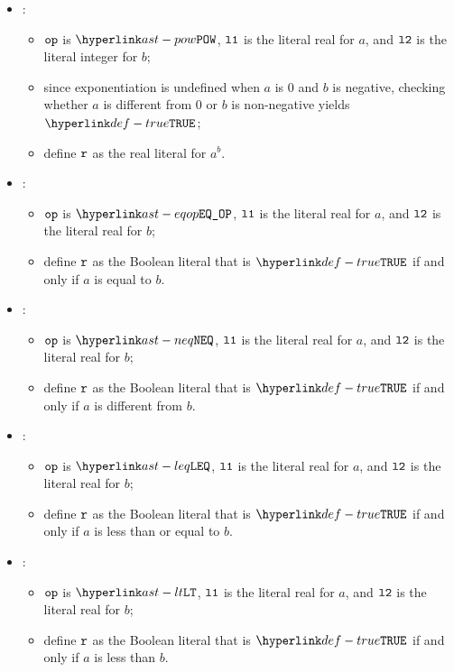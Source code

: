 \begin{itemize}
  \item {}:
  \begin{itemize}
    \item $\texttt{op}$ is $\POW$, $\texttt{l1}$ is the literal real for $a$, and $\texttt{l2}$ is the literal integer for $b$;
    \item since exponentiation is undefined when $a$ is 0 and $b$ is negative,
          checking whether $a$ is different from $0$ or $b$ is non-negative yields $\True$\ProseOrTypeError;
    \item define $\texttt{r}$ as the real literal for $a^b$.
  \end{itemize}

  \item {}:
  \begin{itemize}
    \item $\texttt{op}$ is $\EQOP$, $\texttt{l1}$ is the literal real for $a$, and $\texttt{l2}$ is the literal real for $b$;
    \item define $\texttt{r}$ as the Boolean literal that is $\True$ if and only if $a$ is equal to $b$.
  \end{itemize}

  \item {}:
  \begin{itemize}
    \item $\texttt{op}$ is $\NEQ$, $\texttt{l1}$ is the literal real for $a$, and $\texttt{l2}$ is the literal real for $b$;
    \item define $\texttt{r}$ as the Boolean literal that is $\True$ if and only if $a$ is different from $b$.
  \end{itemize}

  \item {}:
  \begin{itemize}
    \item $\texttt{op}$ is $\LEQ$, $\texttt{l1}$ is the literal real for $a$, and $\texttt{l2}$ is the literal real for $b$;
    \item define $\texttt{r}$ as the Boolean literal that is $\True$ if and only if $a$ is less than or equal to $b$.
  \end{itemize}

  \item {}:
  \begin{itemize}
    \item $\texttt{op}$ is $\LT$, $\texttt{l1}$ is the literal real for $a$, and $\texttt{l2}$ is the literal real for $b$;
    \item define $\texttt{r}$ as the Boolean literal that is $\True$ if and only if $a$ is less than $b$.
  \end{itemize}


\end{itemize}
